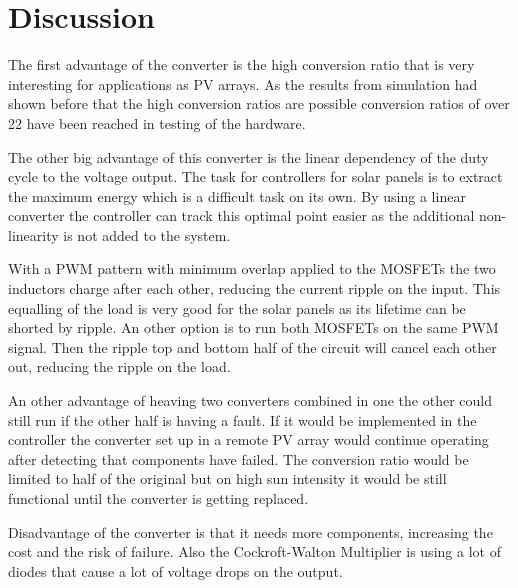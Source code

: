 \chapter{Discussion}\label{ch:Discussion}


The first advantage of the converter is the high conversion ratio that is very interesting for applications as PV arrays. As the results from simulation had shown before that the high conversion ratios are possible conversion ratios of over 22 have been reached in testing of the hardware.


The other big advantage of this converter is the linear dependency of the duty cycle to the voltage output. The task for controllers for solar panels is to extract the maximum energy which is a difficult task on its own. 
By using a linear converter the controller can track this optimal point easier as the additional non-linearity is not added to the system.


With a PWM pattern with minimum overlap applied to the MOSFETs the two inductors charge after each other, reducing the current ripple on the input. This equalling of the load is very good for the solar panels as its lifetime can be shorted by ripple. %
An other option is to run both MOSFETs on the same PWM signal.
Then the ripple top and bottom half of the circuit will cancel each other out, reducing the ripple on the load. 

An other advantage of heaving two converters combined in one the other could still run if the other half is having a fault.
If it would be implemented in the controller the converter set up in a remote PV array would continue operating after detecting that components have failed. 
The conversion ratio would be limited to half of the original but on high sun intensity it would be still functional until the converter is getting replaced.


Disadvantage of the converter is that it needs more components, increasing the cost and the risk of failure.
Also the Cockroft-Walton Multiplier is using a lot of diodes that cause a lot of voltage drops on the output.